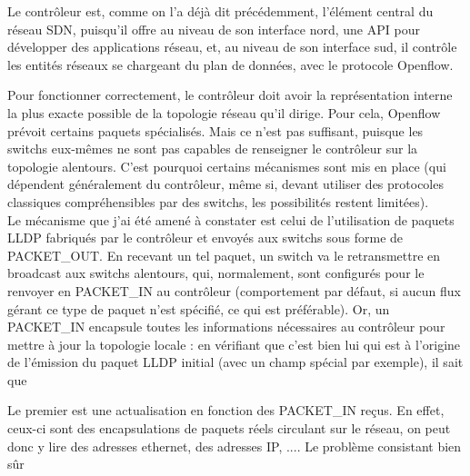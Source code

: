 Le contrôleur est, comme on l'a déjà dit précédemment, l'élément central du réseau SDN, puisqu'il offre au niveau de son interface nord, une API pour développer des applications réseau, et, au niveau de son interface sud, il contrôle les entités réseaux se chargeant du plan de données, avec le protocole Openflow.

Pour fonctionner correctement, le contrôleur doit avoir la représentation interne la plus exacte possible de la topologie réseau qu'il dirige. Pour cela, Openflow prévoit certains paquets spécialisés. Mais ce n'est pas suffisant, puisque les switchs eux-mêmes ne sont pas capables de renseigner le contrôleur sur la topologie alentours. C'est pourquoi certains mécanismes sont mis en place (qui dépendent généralement du contrôleur, même si, devant utiliser des protocoles classiques compréhensibles par des switchs, les possibilités restent limitées).\\
Le mécanisme que j'ai été amené à constater est celui de l'utilisation de paquets LLDP fabriqués par le contrôleur et envoyés aux switchs sous forme de PACKET_OUT. En recevant un tel paquet, un switch va le retransmettre en broadcast aux switchs alentours, qui, normalement, sont configurés pour le renvoyer en PACKET_IN au contrôleur (comportement par défaut, si aucun flux gérant ce type de paquet n'est spécifié, ce qui est préférable). Or, un PACKET_IN encapsule toutes les informations nécessaires au contrôleur pour mettre à jour la topologie locale : en vérifiant que c'est bien lui qui est à l'origine de l'émission du paquet LLDP initial (avec un champ spécial par exemple), il sait que 

Le premier est une actualisation en fonction des PACKET_IN reçus. En effet, ceux-ci sont des encapsulations de paquets réels circulant sur le réseau, on peut donc y lire des adresses ethernet, des adresses IP, .... Le problème consistant bien sûr 